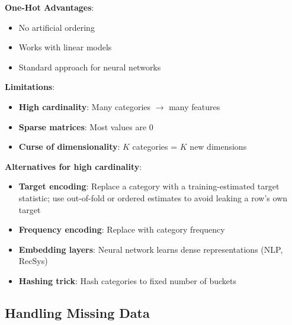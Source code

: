 \documentclass[11pt,twoside]{article}
\numberwithin{equation}{section}
\theoremstyle{plain}
\theoremstyle{definition}
\theoremstyle{remark}
\newenvironment{keyidea}{
  \begin{tcolorbox}[colback=yellow!5!white,
                    colframe=yellow!50!black,
                    title=Key Idea,
                    breakable,
                    enhanced,
                    sharp corners,
                    boxrule=0.8pt,
                    left=6pt, right=6pt, top=6pt, bottom=6pt]
}{
  \end{tcolorbox}
}
\begin{document}
\begin{keyidea}
\textbf{One-Hot Advantages}:
\begin{itemize}
\item No artificial ordering
\item Works with linear models
\item Standard approach for neural networks
\end{itemize}

\textbf{Limitations}:
\begin{itemize}
\item \textbf{High cardinality}: Many categories $\to$ many features
\item \textbf{Sparse matrices}: Most values are 0
\item \textbf{Curse of dimensionality}: $K$ categories = $K$ new dimensions
\end{itemize}

\textbf{Alternatives for high cardinality}:
\begin{itemize}
\item \textbf{Target encoding}: Replace a category with a training-estimated target statistic; use out-of-fold or ordered estimates to avoid leaking a row's own target
\item \textbf{Frequency encoding}: Replace with category frequency
\item \textbf{Embedding layers}: Neural network learns dense representations (NLP, RecSys)
\item \textbf{Hashing trick}: Hash categories to fixed number of buckets
\end{itemize}
\end{keyidea}

\subsection{Handling Missing Data}
\end{document}
